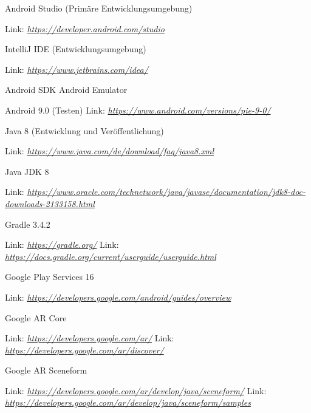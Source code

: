 \documentclass{scrartcl}
\begin{document}
\noindent Android Studio (Primäre Entwicklungsumgebung)

\noindent Link: \textit{\url{https://developer.android.com/studio} \newline}

\noindent IntelliJ IDE  (Entwicklungsumgebung)

\noindent Link: \textit{\url{https://www.jetbrains.com/idea/} \newline}

\noindent Android SDK \newline
\noindent Android Emulator \newline

\noindent Android 9.0 (Testen) \newline 
\noindent Link: \textit{\url{https://www.android.com/versions/pie-9-0/} \newline}

\noindent Java 8 (Entwicklung und Veröffentlichung)

\noindent Link: \textit{\url{https://www.java.com/de/download/faq/java8.xml} \newline}

\noindent Java JDK 8 

\noindent Link: \textit{\url{https://www.oracle.com/technetwork/java/javase/documentation/jdk8-doc-downloads-2133158.html} \newline}

\noindent Gradle 3.4.2 

\noindent Link: \textit{\url{https://gradle.org/} \newline}
\noindent Link: \textit{\url{https://docs.gradle.org/current/userguide/userguide.html} \newline}

\noindent Google Play Services 16 

\noindent Link: \textit{\url{https://developers.google.com/android/guides/overview} \newline}

\noindent Google AR Core

\noindent Link: \textit{\url{https://developers.google.com/ar/} \newline}
\noindent Link: \textit{\url{https://developers.google.com/ar/discover/} \newline}

\noindent Google AR Sceneform

\noindent Link: \textit{\url{https://developers.google.com/ar/develop/java/sceneform/} \newline}
\noindent Link: \textit{\url{https://developers.google.com/ar/develop/java/sceneform/samples} \newline}
\end{document}
